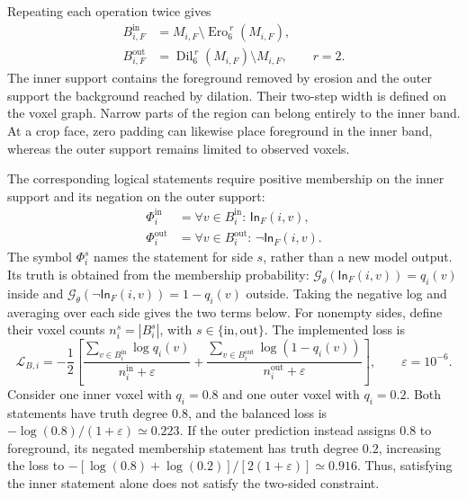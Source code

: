 \documentclass[12pt,a4paper]{article}
\begin{document}
Repeating each operation twice gives
\begin{equation}
\begin{aligned}
B_{i,F}^{\mathrm{in}}
 &=M_{i,F}\setminus\operatorname{Ero}_6^{\,r}(M_{i,F}),\\
B_{i,F}^{\mathrm{out}}
 &=\operatorname{Dil}_6^{\,r}(M_{i,F})\setminus M_{i,F},
\qquad r=2.
\end{aligned}
\label{eq:reference-boundary-bands}
\end{equation}
The inner support contains the foreground removed by erosion and the
outer support the background reached by dilation. Their two-step width
is defined on the voxel graph. Narrow parts of the region can belong
entirely to the inner band. At a crop face, zero padding can likewise
place foreground in the inner band, whereas the outer support remains
limited to observed voxels.

The corresponding logical statements require positive membership on
the inner support and its negation on the outer support:
\begin{equation}
\begin{aligned}
\Phi_i^{\mathrm{in}}
 &=\forall v\in B_i^{\mathrm{in}}:\,\mathsf{In}_{F}(i,v),\\
\Phi_i^{\mathrm{out}}
 &=\forall v\in B_i^{\mathrm{out}}:\,\lnot\mathsf{In}_{F}(i,v).
\end{aligned}
\label{eq:band-logical-statements}
\end{equation}
The symbol $\Phi_i^s$ names the statement for side $s$, rather than a
new model output. Its truth is obtained from the membership probability:
$\mathcal G_\theta(\mathsf{In}_F(i,v))=q_i(v)$ inside and
$\mathcal G_\theta(\lnot\mathsf{In}_F(i,v))=1-q_i(v)$ outside.
Taking the negative log and averaging over each side gives the two terms
below. For nonempty sides, define their voxel counts
$n_i^s=|B_i^s|$, with $s\in\{\mathrm{in},\mathrm{out}\}$. The implemented loss is
\begin{equation}
\mathcal L_{B,i}=-\frac12\left[
\frac{\sum_{v\in B_i^{\mathrm{in}}}\log q_i(v)}{n_i^{\mathrm{in}}+\varepsilon}
+\frac{\sum_{v\in B_i^{\mathrm{out}}}\log(1-q_i(v))}{n_i^{\mathrm{out}}+\varepsilon}
\right],\qquad \varepsilon=10^{-6}.
\label{eq:balanced-band-loss}
\end{equation}
Consider one inner voxel with $q_i=0.8$ and one outer voxel with
$q_i=0.2$. Both statements have truth degree $0.8$, and the balanced
loss is $-\log(0.8)/(1+\varepsilon)\simeq0.223$. If the outer
prediction instead assigns $0.8$ to foreground, its negated membership
statement has truth degree $0.2$, increasing the loss to
$-[\log(0.8)+\log(0.2)]/[2(1+\varepsilon)]\simeq0.916$.
Thus, satisfying the inner statement alone does not satisfy the
two-sided constraint.
\end{document}
